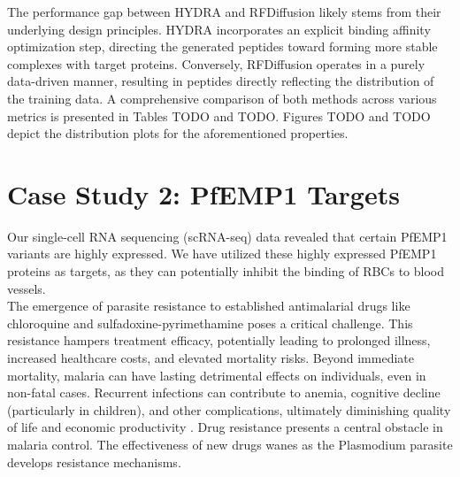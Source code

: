 The performance gap between HYDRA and RFDiffusion likely stems from their underlying design principles. HYDRA incorporates an explicit binding affinity optimization step, directing the generated peptides toward forming more stable complexes with target proteins. Conversely, RFDiffusion operates in a purely data-driven manner, resulting in peptides directly reflecting the distribution of the training data.
A comprehensive comparison of both methods across various metrics is presented in Tables TODO and TODO. Figures TODO and TODO depict the distribution plots for the aforementioned properties.

\section{Case Study 2: PfEMP1 Targets}
Our single-cell RNA sequencing (scRNA-seq) data revealed that certain PfEMP1 variants are highly expressed. We have utilized these highly expressed PfEMP1 proteins as targets, as they can potentially inhibit the binding of RBCs to blood vessels. \\

The emergence of parasite resistance to established antimalarial drugs like chloroquine and sulfadoxine-pyrimethamine poses a critical challenge. This resistance hampers treatment efficacy, potentially leading to prolonged illness, increased healthcare costs, and elevated mortality risks. Beyond immediate mortality, malaria can have lasting detrimental effects on individuals, even in non-fatal cases. Recurrent infections can contribute to anemia, cognitive decline (particularly in children), and other complications, ultimately diminishing quality of life and economic productivity \cite{shukla2023supervised}. Drug resistance presents a central obstacle in malaria control. The effectiveness of new drugs wanes as the Plasmodium parasite develops resistance mechanisms. \\


